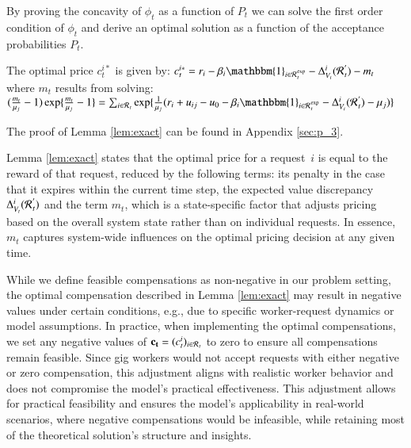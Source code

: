 By proving the concavity of $\phi_t$ as a function of $P_t$ we can solve the first order condition of $\phi_t$ and derive an optimal solution as a function of the acceptance probabilities $P_t$.
\begin{lemma}\label{lem:exact}
The optimal price $c^{i*}_t$ is given by:
$c^{i*}_t = r_i - \beta_i \mathbbm{1}_{i \in \mathcal{R}\hspace{0.05em}_t^{\mathrm{exp}}} 
 - \Delta^i_{V_{t}}(\mathcal{R}\hspace{0.05em}_t^{'}) - m_t$ where $m_t$ results from solving: 
 $(\frac{m_t}{\mu_j} - 1) \exp\{ \frac{m_t}{\mu_j} - 1\} = \sum_{i \in \mathcal{R}\hspace{0.05em}_{t}} \exp\{ \frac{1}{\mu_j} (r_i + u_{ij} - u_0 - \beta_i \mathbbm{1}_{i \in \mathcal{R}\hspace{0.05em}_t^{\mathrm{exp}}} - \Delta^i_{V_{t}}(\mathcal{R}\hspace{0.05em}_t^{'}) - \mu_j)\}$
\end{lemma}
The proof of Lemma \ref{lem:exact} can be found in Appendix \ref{sec:p_3}. 

Lemma \ref{lem:exact} states that the optimal price for a request~$i$ is equal to the reward of that request, reduced by the following terms: its penalty in the case that it expires within the current time step, the expected value discrepancy $\Delta^i_{V_{t}}(\mathcal{R}\hspace{0.05em}_t^{'})$ and the term $m_t$, which is a state-specific factor that adjusts pricing based on the overall system state rather than on individual requests. In essence, $m_t$ captures system-wide influences on the optimal pricing decision at any given time.

While we define feasible compensations as non-negative in our problem setting, the optimal compensation described in Lemma \ref{lem:exact} may result in negative values under certain conditions, e.g., due to specific worker-request dynamics or model assumptions. In practice, when implementing the optimal compensations, we set any negative values of $\mathbf{c_t} = (c^i_t)_{i \in \mathcal{R}\hspace{0.05em}_{t}}$ to zero to ensure all compensations remain feasible. Since gig workers would not accept requests with either negative or zero compensation, this adjustment aligns with realistic worker behavior and does not compromise the model's practical effectiveness. This adjustment allows for practical feasibility and ensures the model’s applicability in real-world scenarios, where negative compensations would be infeasible, while retaining most of the theoretical solution’s structure and insights.


